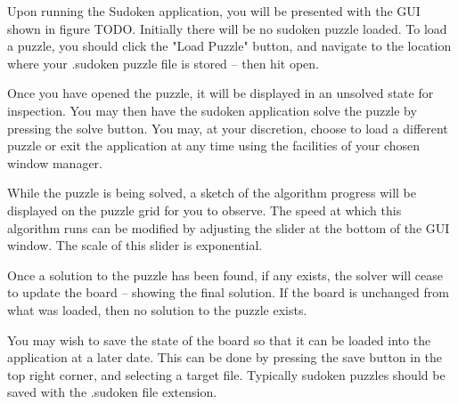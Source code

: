 Upon running the Sudoken application, you will be presented with the GUI shown in figure TODO. Initially there will be no sudoken puzzle loaded. To load a puzzle, you should click the "Load Puzzle" button, and navigate to the location where your .sudoken puzzle file is stored -- then hit open.

Once you have opened the puzzle, it will be displayed in an unsolved state for inspection. You may then have the sudoken application solve the puzzle by pressing the solve button. You may, at your discretion, choose to load a different puzzle or exit the application at any time using the facilities of your chosen window manager.

While the puzzle is being solved, a sketch of the algorithm progress will be displayed on the puzzle grid for you to observe. The speed at which this algorithm runs can be modified by adjusting the slider at the bottom of the GUI window. The scale of this slider is exponential.

Once a solution to the puzzle has been found, if any exists, the solver will cease to update the board -- showing the final solution. If the board is unchanged from what was loaded, then no solution to the puzzle exists.

You may wish to save the state of the board so that it can be loaded into the application at a later date. This can be done by pressing the save button in the top right corner, and selecting a target file. Typically sudoken puzzles should be saved with the .sudoken file extension.
